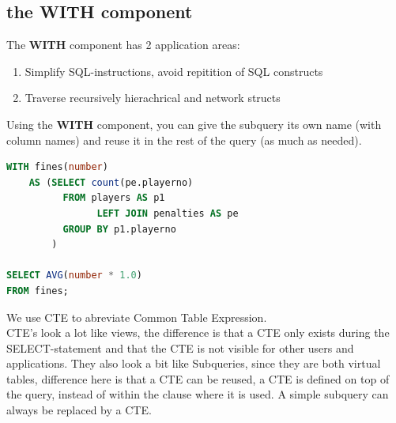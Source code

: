 \documentclass{report}
\begin{document}
	\subsection{the WITH component}
	The \textbf{WITH} component has 2 application areas: 
	\begin{enumerate}
		\item Simplify SQL-instructions, avoid repitition of SQL constructs
		\item Traverse recursively hierachrical and network structs
	\end{enumerate}
	Using the \textbf{WITH} component, you can give the subquery its own name (with column names) and reuse it in the rest of the query (as much as needed).
	\begin{lstlisting}[language=sql]
WITH fines(number)
	AS (SELECT count(pe.playerno)
		  FROM players AS p1
			 	LEFT JOIN penalties AS pe
		  GROUP BY p1.playerno
		)
		
SELECT AVG(number * 1.0)
FROM fines;	\end{lstlisting}
	We use CTE to abreviate Common Table Expression.
	\\
	CTE's look a lot like views, the difference is that a CTE only exists during the SELECT-statement and that the CTE is not visible for other users and applications. They also look a bit like Subqueries, since they are both virtual tables, difference here is that a CTE can be reused, a CTE is defined on top of the query, instead of within the clause where it is used. A simple subquery can always be replaced by a CTE.
\end{document}
